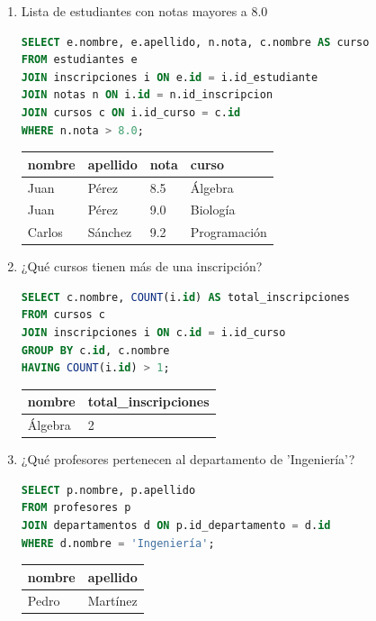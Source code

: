 \documentclass[12pt,letterpaper]{article}
\begin{document}
\begin{enumerate}
    \item Lista de estudiantes con notas mayores a 8.0
\begin{lstlisting}[language=SQL, frame=single]
SELECT e.nombre, e.apellido, n.nota, c.nombre AS curso 
FROM estudiantes e 
JOIN inscripciones i ON e.id = i.id_estudiante 
JOIN notas n ON i.id = n.id_inscripcion 
JOIN cursos c ON i.id_curso = c.id 
WHERE n.nota > 8.0;
\end{lstlisting}
    \begin{table}[H]
        \centering
        \begin{tabular}{|l|l|l|l|}
        \hline
        \textbf{nombre} & \textbf{apellido} & \textbf{nota} & \textbf{curso} \\ \hline
        Juan & Pérez & 8.5 & Álgebra \\ 
        Juan & Pérez & 9.0 & Biología \\ 
        Carlos & Sánchez & 9.2 & Programación \\ \hline
        \end{tabular}
    \end{table}

    \item ¿Qué cursos tienen más de una inscripción?
\begin{lstlisting}[language=SQL, frame=single]
SELECT c.nombre, COUNT(i.id) AS total_inscripciones 
FROM cursos c 
JOIN inscripciones i ON c.id = i.id_curso 
GROUP BY c.id, c.nombre 
HAVING COUNT(i.id) > 1;
\end{lstlisting}
    \begin{table}[H]
        \centering
        \begin{tabular}{|l|l|}
        \hline
        \textbf{nombre} & \textbf{total\_inscripciones} \\ \hline
        Álgebra & 2 \\ \hline
        \end{tabular}
    \end{table}

    \item ¿Qué profesores pertenecen al departamento de 'Ingeniería'?
\begin{lstlisting}[language=SQL, frame=single]
SELECT p.nombre, p.apellido 
FROM profesores p 
JOIN departamentos d ON p.id_departamento = d.id 
WHERE d.nombre = 'Ingeniería';
\end{lstlisting}
    \begin{table}[H]
        \centering
        \begin{tabular}{|l|l|}
        \hline
        \textbf{nombre} & \textbf{apellido} \\ \hline
        Pedro & Martínez \\ \hline
        \end{tabular}
    \end{table}


\end{enumerate}
\end{document}
